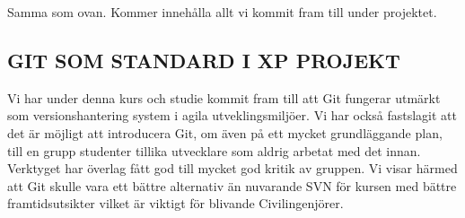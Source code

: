 Samma som ovan. Kommer innehålla allt vi kommit fram till under projektet.

\subsection{GIT SOM STANDARD I XP PROJEKT}
Vi har under denna kurs och studie kommit fram till att Git fungerar utmärkt som versionshantering system i agila utveklingsmiljöer. Vi har också fastslagit att det är möjligt att introducera Git, om även på ett mycket grundläggande plan, till en grupp studenter tillika utvecklare som aldrig arbetat med det innan. Verktyget har överlag fått god till mycket god kritik av gruppen. Vi visar härmed att Git skulle vara ett bättre alternativ än nuvarande SVN för kursen med bättre framtidsutsikter vilket är viktigt för blivande Civilingenjörer. 